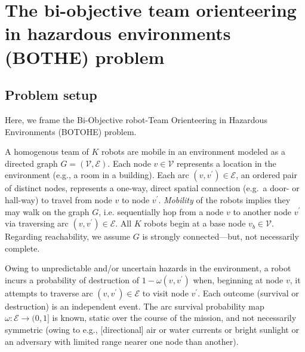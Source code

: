 \documentclass[fleqn,10pt,lineno]{wlpeerj}
\begin{document}
\section{The bi-objective team orienteering in hazardous environments (BOTHE) problem}



\subsection{Problem setup}
Here, we frame the Bi-Objective robot-Team Orienteering in Hazardous Environments (BOTOHE) problem. 


A homogenous team of $K$ robots are mobile in an environment modeled as a directed graph $G=(\mathcal{V}, \mathcal{E})$. Each node $v \in \mathcal{V}$ represents a location in the environment (e.g., a room in a building). Each arc $(v, v^\prime) \in\mathcal{E}$, an ordered pair of distinct nodes, represents a one-way, direct spatial connection (e.g.\ a door- or hall-way) to travel from node $v$ to node $v^\prime$. 
\emph{Mobility} of the robots implies they may walk on the graph $G$, i.e. sequentially hop from a node $v$ to another node $v^\prime$ via traversing arc $(v, v^\prime)\in\mathcal{E}$.
All $K$ robots begin at a base node $v_b \in \mathcal{V}$. 
Regarding reachability, we assume $G$ is strongly connected---but, not necessarily complete. 

Owing to unpredictable and/or uncertain hazards in the environment, a robot incurs a probability of destruction of $1 - \omega(v, v^\prime)$ when, beginning at node $v$, it attempts to traverse arc $(v, v^\prime) \in \mathcal{E}$ to visit node $v^\prime$.
Each outcome (survival or destruction) is an independent event. 
The arc survival probability map $\omega: \mathcal{E} \rightarrow (0, 1]$ is known, static over the course of the mission, and not necessarily symmetric (owing to e.g., [directional] air or water currents or bright sunlight or an adversary with limited range nearer one node than another).
\end{document}
